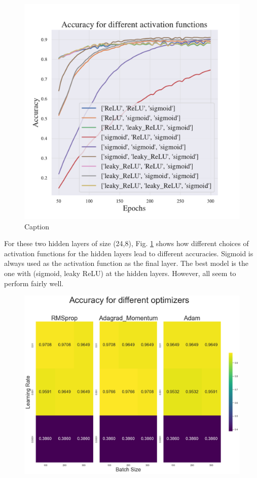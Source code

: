 \begin{figure}[h!]
    \centering
    \includegraphics[width=1.0\linewidth]{project_2/figures/Accuracy for different activation functions_classification.pdf}
    \caption{Caption}
    \label{fig:activations_cancer}
\end{figure}

For these two hidden layers of size (24,8), Fig. \ref{fig:activations_cancer} shows how different choices of activation functions for the hidden layers lead to different accuracies. 
Sigmoid is always used as the activation function as the final layer. 
The best model is the one with (sigmoid, leaky ReLU) at the hidden layers. 
However, all seem to perform fairly well. 

\begin{figure}[h!]
    \centering
    \includegraphics[width=1.0\linewidth]{project_2/figures/acc_grid_clas.png}
    \caption{}    
    \label{fig:grid_cancer}
\end{figure}

